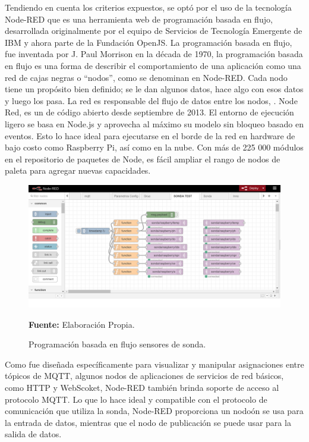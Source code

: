 Tendiendo en cuenta los criterios expuestos, se opt\'o por el uso de la tecnolog\'ia Node-RED que es una herramienta web de programación basada en flujo, desarrollada originalmente por el equipo de Servicios de Tecnología Emergente de IBM y ahora parte de la Fundación OpenJS.
La programaci\'on basada en flujo, fue inventada por J. Paul Morrison en la década de 1970, la programación basada en flujo es una forma de describir el comportamiento de una aplicación como una red de cajas negras o “nodos”, como se denominan en Node-RED. Cada nodo tiene un propósito bien definido; se le dan algunos datos, hace algo con esos datos y luego los pasa. La red es responsable del flujo de datos entre los nodos, \cite{noauthor_about_nodate}.
Node Red, es un de código abierto desde septiembre de 2013. El entorno de ejecución ligero se basa en Node.js y aprovecha al máximo su modelo sin bloqueo basado en eventos. Esto lo hace ideal para ejecutarse en el borde de la red en hardware de bajo costo como Raspberry Pi, así como en la nube. Con más de 225 000 módulos en el repositorio de paquetes de Node, es fácil ampliar el rango de nodos de paleta para agregar nuevas capacidades.

\begin{figure}[H]
    \centering
    \includegraphics[width=0.75\linewidth]{Imagenes/cap3/flujoNode_red.png}
    \caption {Programaci\'on basada en flujo sensores de sonda. }{\textbf{Fuente:}
    Elaboraci\'on Propia. }
    \label{fig:M1CE}
\end{figure}

Como fue dise\~nada espec\'ificamente para visualizar y manipular asignaciones entre t\'opicos de MQTT, algunos nodos de aplicaciones de servicios de red b\'asicos, como HTTP y WebScoket, Node-RED tambi\'en brinda soporte de acceso al protocolo MQTT. 
Lo que lo hace ideal y compatible con el protocolo de comunicaci\'on que utiliza la sonda, Node-RED proporciona un nodo\'on se usa para la entrada de datos, mientras que el nodo de publicaci\'on se puede usar para la salida de datos.